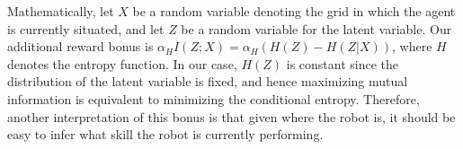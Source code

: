 \documentclass{article} %
\begin{document}
Mathematically, let $X$ be a random variable denoting the grid in which the agent is currently situated, and let $Z$ be a random variable for the latent variable. Our additional reward bonus is $\alpha_H I(Z;X) = \alpha_H (H(Z) - H(Z|X))$, where $H$ denotes the entropy function. In our case, $H(Z)$ is constant since the distribution of the latent variable is fixed, and hence maximizing mutual information is equivalent to minimizing the conditional entropy. Therefore, another interpretation of this bonus is that given where the robot is, it should be easy to infer what skill the robot is currently performing. %



\end{document}
